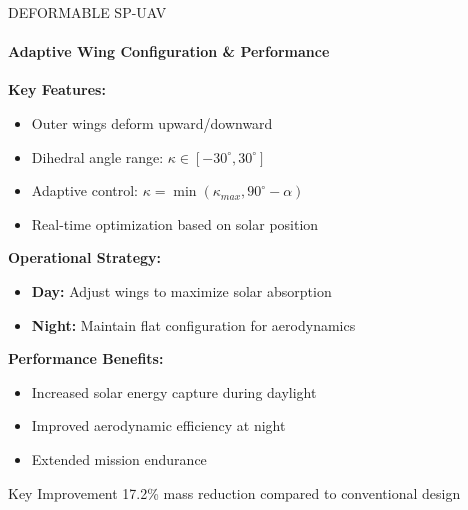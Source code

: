 \documentclass{beamer}
\begin{document}
\begin{frame}{DEFORMABLE SP-UAV}
    \framesubtitle{Adaptive Wing Configuration \& Performance}
    
    \textbf{Key Features:}
    \begin{itemize}
        \item Outer wings deform upward/downward
        \item Dihedral angle range: $\kappa \in [-30^\circ, 30^\circ]$
        \item Adaptive control: $\kappa = \min(\kappa_{max}, 90^\circ - \alpha)$
        \item Real-time optimization based on solar position
    \end{itemize}
    
    \vspace{0.3cm}
    \textbf{Operational Strategy:}
    \begin{itemize}
        \item \textbf{Day:} Adjust wings to maximize solar absorption
        \item \textbf{Night:} Maintain flat configuration for aerodynamics
    \end{itemize}
    
    \vspace{0.3cm}
    \textbf{Performance Benefits:}
    \begin{itemize}
        \item Increased solar energy capture during daylight
        \item Improved aerodynamic efficiency at night
        \item Extended mission endurance
    \end{itemize}
    
    \begin{alertblock}{Key Improvement}
        17.2\% mass reduction compared to conventional design
    \end{alertblock}
\end{frame}
\end{document}

